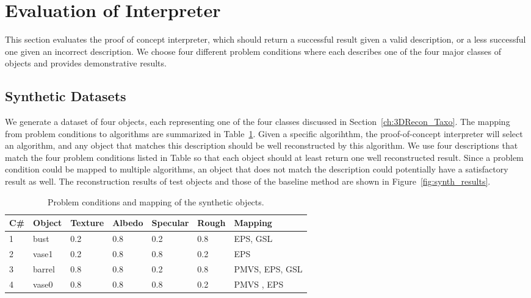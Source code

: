 \section{Evaluation of Interpreter}
\label{sec:eval_interp}
This section evaluates the proof of concept interpreter, which should return a successful result given a valid description, or a less successful one given an incorrect description. We choose four different problem conditions where each describes one of the four major classes of objects and provides demonstrative results.

\subsection{Synthetic Datasets}
We generate a dataset of four objects, each representing one of the four classes discussed in Section~\ref{ch:3DRecon_Taxo}. The mapping from problem conditions to algorithms are summarized in Table~\ref{tab:synth_prop_list}. Given a specific algorihthm, the proof-of-concept interpreter will select an algorithm, and any object that matches this description should be well reconstructed by this algorithm. We use four descriptions that match the four problem conditions listed in Table so that each object should at least return one well reconstructed result. Since a problem condition could be mapped to multiple algorithms, an object that does not match the description could potentially have a satisfactory result as well. The reconstruction results of test objects and those of the baseline method are shown in Figure~\ref{fig:synth_results}.
\begin{table}[!htbp]
  \centering
  \begin{tabular}{lllllll}
  \hline
  \textbf{C\#} & \textbf{Object} & Texture & Albedo & Specular & Rough & Mapping\\
  \hline
  1 & bust & 0.2 & 0.8 & 0.2 & 0.8 & EPS, GSL\\
  2 & vase1 & 0.2 & 0.8 & 0.8 & 0.2 & EPS\\
  3 & barrel & 0.8 & 0.8 & 0.2 & 0.8 & PMVS, EPS, GSL\\
  4 & vase0 & 0.8 & 0.8 & 0.8 & 0.2 & PMVS , EPS\\
  \hline
  \end{tabular}
  \caption{Problem conditions and mapping of the synthetic objects.}
  \label{tab:synth_prop_list}
\end{table}

